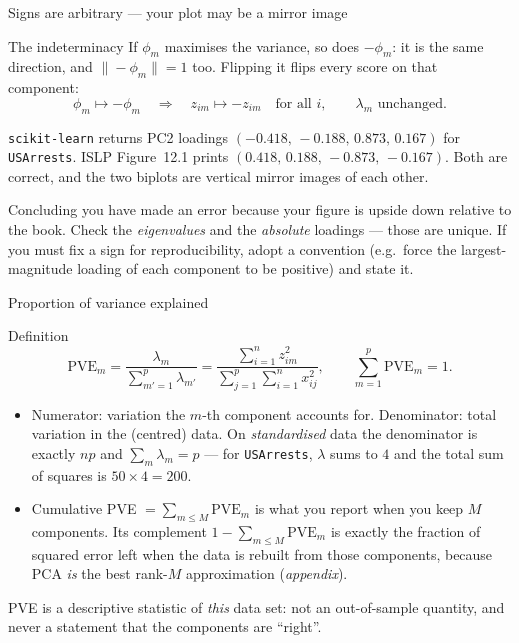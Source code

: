 \documentclass[aspectratio=169,11pt]{beamer}
\begin{document}
\begin{frame}{Signs are arbitrary --- your plot may be a mirror image}
  \footnotesize
  \begin{block}{The indeterminacy}
    If $\phi_m$ maximises the variance, so does $-\phi_m$: it is the same direction, and
    $\|-\phi_m\|=1$ too. Flipping it flips every score on that component:
    \[
      \phi_m \mapsto -\phi_m \quad\Longrightarrow\quad z_{im}\mapsto -z_{im}
      \quad\text{for all } i, \qquad \lambda_m \text{ unchanged.}
    \]
  \end{block}
  \begin{numexample}
    \texttt{scikit-learn} returns PC2 loadings $(-0.418,\,-0.188,\,0.873,\,0.167)$ for
    \texttt{USArrests}. ISLP Figure~12.1 prints $(0.418,\,0.188,\,-0.873,\,-0.167)$.
    Both are correct, and the two biplots are vertical mirror images of each other.
  \end{numexample}
  \begin{mistake}
    Concluding you have made an error because your figure is upside down relative to the
    book. Check the \emph{eigenvalues} and the \emph{absolute} loadings --- those are
    unique. If you must fix a sign for reproducibility, adopt a convention (e.g.\ force the
    largest-magnitude loading of each component to be positive) and state it.
  \end{mistake}
\end{frame}

\begin{frame}{Proportion of variance explained}
  \footnotesize
  \begin{block}{Definition}
    \[
      \boxed{\;\mathrm{PVE}_m=\frac{\lambda_m}{\sum_{m'=1}^{p}\lambda_{m'}}
      =\frac{\sum_{i=1}^{n}z_{im}^{2}}{\sum_{j=1}^{p}\sum_{i=1}^{n}x_{ij}^{2}} ,
      \qquad \sum_{m=1}^{p}\mathrm{PVE}_m=1 .\;}
    \]
  \end{block}
  \begin{readme}
    \begin{itemize}
      \item Numerator: variation the $m$-th component accounts for. Denominator: total
            variation in the (centred) data. On \emph{standardised} data the denominator is
            exactly $np$ and $\sum_m\lambda_m=p$ --- for \texttt{USArrests}, $\lambda$ sums
            to $4$ and the total sum of squares is $50\times4=200$.
      \item Cumulative PVE $=\sum_{m\le M}\mathrm{PVE}_m$ is what you report when you keep
            $M$ components. Its complement $1-\sum_{m\le M}\mathrm{PVE}_m$ is exactly the
            fraction of squared error left when the data is rebuilt from those components,
            because PCA \emph{is} the best rank-$M$ approximation (\emph{appendix}).
    \end{itemize}
  \end{readme}
  \begin{takeaway}
    PVE is a descriptive statistic of \emph{this} data set: not an out-of-sample quantity,
    and never a statement that the components are ``right''.
  \end{takeaway}
\end{frame}
\end{document}
